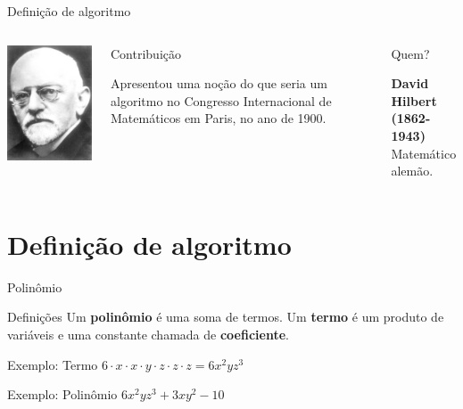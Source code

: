 \documentclass[xcolor=dvipsnames,table]{beamer}
\begin{document}
	\begin{frame}{Definição de algoritmo}
		\begin{columns}
			\begin{center}
				\includegraphics[height=.5\textheight]{images/hilbert.jpg}
			\end{center}
			\begin{block}{Contribuição}
				\begin{center}
					{\large Apresentou uma noção do que seria um algoritmo no Congresso Internacional de Matemáticos em Paris, no ano de 1900.}
				\end{center}
			\end{block}		  		
			\begin{block}{Quem?}
				\begin{center}
					{\bf David Hilbert (1862-1943)} \\ Matemático alemão.
				\end{center}
			\end{block}
		\end{columns}
	\end{frame}
	
	\section{Definição de algoritmo}
	
	\begin{frame}{Polinômio}
		\begin{block}{Definições}	
			Um {\bf polinômio} é uma soma de termos. Um {\bf termo} é um produto de variáveis e uma constante chamada de {\bf coeficiente}.
		\end{block}\pause
		\begin{block}{Exemplo: Termo}
			$6 \cdot x \cdot x \cdot y \cdot z \cdot z \cdot z= 6x^2 y z^3$
		\end{block}\pause
		\begin{block}{Exemplo: Polinômio}
			$6x^2 y z^3 + 3x y^2 - 10$
		\end{block}
	\end{frame}
	
\end{document}
